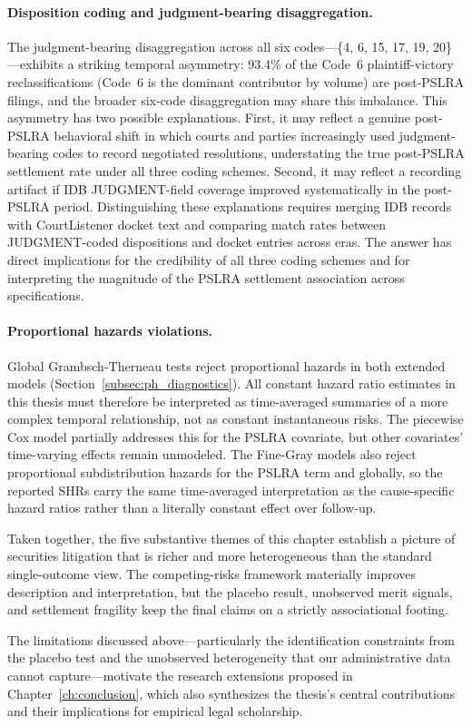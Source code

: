 \paragraph{Disposition coding and judgment-bearing disaggregation.}
The judgment-bearing disaggregation across all six codes---\{4, 6, 15, 17, 19, 20\}---exhibits a striking temporal asymmetry: 93.4\% of the Code~6 plaintiff-victory reclassifications (Code~6 is the dominant contributor by volume) are post-PSLRA filings, and the broader six-code disaggregation may share this imbalance. This asymmetry has two possible explanations. First, it may reflect a genuine post-PSLRA behavioral shift in which courts and parties increasingly used judgment-bearing codes to record negotiated resolutions, understating the true post-PSLRA settlement rate under all three coding schemes. Second, it may reflect a recording artifact if IDB JUDGMENT-field coverage improved systematically in the post-PSLRA period. Distinguishing these explanations requires merging IDB records with CourtListener docket text and comparing match rates between JUDGMENT-coded dispositions and docket entries across eras. The answer has direct implications for the credibility of all three coding schemes and for interpreting the magnitude of the PSLRA settlement association across specifications.

\paragraph{Proportional hazards violations.}
Global Grambsch-Therneau tests reject proportional hazards
in both extended models
(Section~\ref{subsec:ph_diagnostics}). All constant hazard
ratio estimates in this thesis must therefore be interpreted
as time-averaged summaries of a more complex temporal
relationship, not as constant instantaneous risks. The
piecewise Cox model partially addresses this for the PSLRA
covariate, but other covariates' time-varying effects remain
unmodeled. The Fine-Gray models also reject proportional
subdistribution hazards for the PSLRA term and globally, so
the reported SHRs carry the same time-averaged interpretation
as the cause-specific hazard ratios rather than a literally
constant effect over follow-up.

Taken together, the five substantive themes of this chapter
establish a picture of securities litigation that is richer
and more heterogeneous than the standard single-outcome view.
The competing-risks framework materially improves description
and interpretation, but the placebo result, unobserved merit
signals, and settlement fragility keep the final claims on a
strictly associational footing.

The limitations discussed above---particularly the
identification constraints from the placebo test and the
unobserved heterogeneity that our administrative data cannot
capture---motivate the research extensions proposed in
Chapter~\ref{ch:conclusion}, which also synthesizes the thesis's
central contributions and their implications for empirical
legal scholarship.
